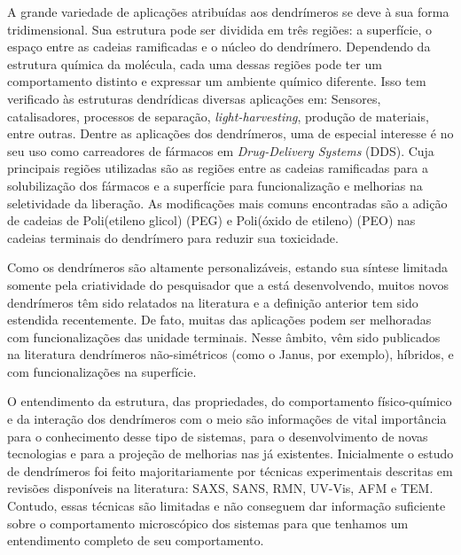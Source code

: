 A grande variedade de aplicações atribuídas aos dendrímeros se deve à sua forma tridimensional\cite{Vogtle2000}.
Sua estrutura pode ser dividida em três regiões: a superfície, o espaço entre as cadeias ramificadas e o núcleo do dendrímero\cite{Dykes2001}.
Dependendo da estrutura química da molécula, cada uma dessas regiões pode ter um comportamento distinto e expressar um ambiente químico diferente.
Isso tem verificado às estruturas dendrídicas diversas aplicações em:
Sensores\cite{ChristineValerio1997, Balzani2000},
catalisadores\cite{Kainz2014,Deraedt2017, P.Bhyrappa1996},
processos de separação\cite{Song2017, Song2017a},
\textit{light-harvesting}\cite{Gilat1999, Adronov2000, Andrews2012},
produção de materiais\cite{Gaertner2011, Arshadi2017, Xie2005},
entre outras.
Dentre as aplicações dos dendrímeros, uma de especial interesse é no seu uso como carreadores de fármacos em \textit{Drug-Delivery Systems} (DDS)\cite{Li2010, Svenson2005, Wei2015, Wang2018, Yesil-Celiktas2017}.
Cuja principais regiões utilizadas são as regiões entre as cadeias ramificadas para a solubilização dos fármacos e a superfície para funcionalização e melhorias na seletividade da liberação.
As modificações mais comuns encontradas são a adição de cadeias de Poli(etileno glicol) (PEG) e Poli(óxido de etileno) (PEO) nas cadeias terminais do dendrímero para reduzir sua toxicidade\cite{Sousa2018}.

Como os dendrímeros são altamente personalizáveis, estando sua síntese limitada somente pela criatividade do pesquisador que a está desenvolvendo, muitos novos dendrímeros têm sido relatados na literatura e a definição anterior tem sido estendida recentemente.
De fato, muitas das aplicações podem ser melhoradas com funcionalizações das unidade terminais. 
Nesse âmbito, vêm sido publicados na literatura dendrímeros não-simétricos\cite{Wang2018} (como o Janus\cite{Zhang2014, Gao2014, Dengiz2015}, por exemplo), híbridos\cite{Kavyani2016}, e com funcionalizações na superfície\cite{Barraza2017, Sousa2018, Lee2011, Chooi2010}.

O entendimento da estrutura, das propriedades, do comportamento físico-químico e da interação dos dendrímeros com o meio são informações de vital importância para o conhecimento desse tipo de sistemas, para o desenvolvimento de novas tecnologias e para a projeção de melhorias nas já existentes.
Inicialmente o estudo de dendrímeros foi feito majoritariamente por técnicas experimentais descritas em revisões disponíveis na literatura\cite{Caminade2005, Lizama2016}:
SAXS\cite{Prosa2001, Rathgeber2004, Prosa1997},
SANS\cite{Porcar2008, Ramzi1998, Scherrenberg1998},
RMN\cite{Malveau2003},
UV-Vis\cite{Pande2011},
AFM\cite{Li2000} e
TEM\cite{Jackson1998}.
Contudo, essas técnicas são limitadas e não conseguem dar informação suficiente sobre o comportamento microscópico dos sistemas para que tenhamos um entendimento completo de seu comportamento.


